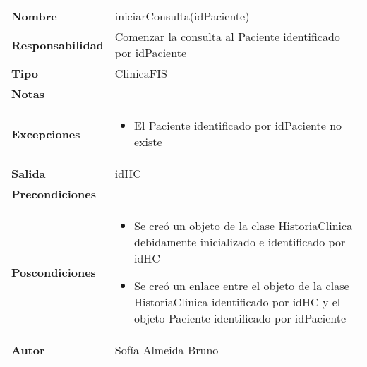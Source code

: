 \documentclass[11pt,a4paper]{article}
\newenvironment{itemizenomargins}
    {\begin{minipage}[t]{1\linewidth}\begin{itemize}}
    {\end{itemize}\end{minipage}}
\begin{document}
\begin{table}[H]
\centering
\label{my-label}
\begin{tabularx}{\textwidth}{l|X}
\textbf{Nombre}          & iniciarConsulta(idPaciente) \\
\textbf{Responsabilidad} & Comenzar la consulta al Paciente identificado por idPaciente\\
\textbf{Tipo}            & ClinicaFIS \\
\textbf{Notas}           &  \\
\textbf{Excepciones}     & 
\begin{itemizenomargins}
\item El Paciente identificado por idPaciente no existe
\end{itemizenomargins}\\
\textbf{Salida}          &  idHC\\
\textbf{Precondiciones}  &  \\
\textbf{Poscondiciones}  &
\begin{itemizenomargins}
\item Se creó un objeto de la clase HistoriaClinica debidamente inicializado e identificado por idHC
\item Se creó un enlace entre el objeto de la clase HistoriaClinica identificado por idHC y el objeto Paciente identificado por idPaciente
\end{itemizenomargins}\\
\textbf{Autor}           & Sofía Almeida Bruno
\end{tabularx}
\end{table}
\end{document}
